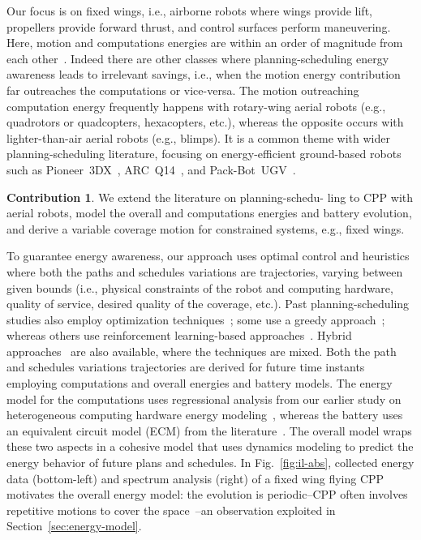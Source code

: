 \documentclass[letterpaper,10pt,journal,twoside]{IEEEtran}
\theoremstyle{definition}
\newtheorem*{ctb}{Contribution}
\begin{document}
Our focus is on fixed wings, i.e., airborne robots where wings provide lift, propellers provide forward thrust, and control surfaces perform maneuvering. Here, motion and computations energies are within an order of magnitude from each other~\cite{seewald2020mechanical}. Indeed there are other classes where planning-scheduling energy awareness leads to irrelevant savings, i.e., when the motion energy contribution far outreaches the computations or vice-versa. The {\color{blue}motion outreaching computation energy} frequently happens with rotary-wing aerial robots (e.g., quadrotors or quadcopters, hexacopters, etc.){\color{blue}, whereas the opposite occurs with} lighter-than-air aerial robots (e.g., blimps). It is a common theme with wider planning-scheduling literature, focusing on energy-efficient ground-based robots such as Pioneer~3DX~\cite{ho2019qos,mei2005case}, ARC~Q14~\cite{ondruska2015scheduled,lahijanian2018resource}, and Pack-Bot~UGV~\cite{sadrpour2013mission}.
\begin{ctb}
  We extend the literature on planning-schedu- ling to CPP with aerial robots, model the overall and computations energies and battery evolution, and derive a variable coverage motion for constrained systems, e.g., fixed wings.
\end{ctb}

To guarantee energy awareness, our approach uses optimal control {\color{blue} and heuristics} where both the paths and schedules variations are trajectories, varying between given bounds (i.e., physical constraints of the robot and computing hardware, quality of service, desired quality of the coverage, etc.). Past planning-scheduling studies also employ optimization techniques~\cite{brateman2006energy,zhang2007low,ondruska2015scheduled,lahijanian2018resource}; some use a greedy approach~\cite{mei2005case,sudhakar2020balancing,sadrpour2013mission}; whereas others use reinforcement learning-based approaches~\cite{ho2019qos,ho2018towards}. {\color{blue}Hybrid approaches~\cite{ondruska2015scheduled} are also available, where the techniques are mixed.} Both the path and schedules variations trajectories are derived for future time instants employing computations and overall energies and battery models. The energy model for the computations uses regressional analysis from our earlier study on heterogeneous computing hardware energy modeling~\cite{seewald2019coarse,seewald2019component}, whereas the battery uses an equivalent circuit model (ECM) from the literature~\cite{%
hinz2019comparison,mousavi2014various}. The overall model wraps these two aspects in a cohesive model that uses dynamics modeling to predict the energy behavior of future plans and schedules. In Fig.~\ref{fig:il-abs}, collected energy data (bottom-left) and spectrum analysis (right) of a fixed wing %
flying CPP motivates the overall energy model: the evolution is periodic--CPP often involves repetitive motions to cover the space~\cite{choset2001coverage,galceran2013survey}--an observation exploited in Section~\ref{sec:energy-model}.%
\end{document}
